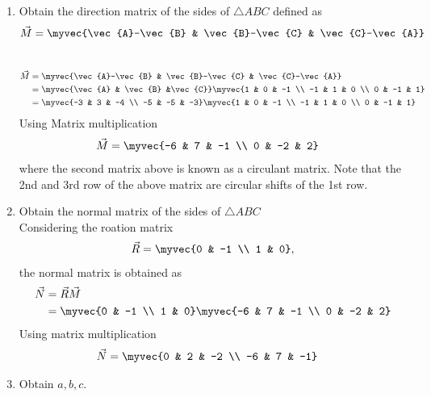 \documentclass[11pt]{book}
\begin{document}
\begin{enumerate}[label=\thesubsection.\arabic*.,ref=\thesubsection.\theenumi]
\item Obtain the direction matrix of the sides of $\triangle ABC$ defined as 
\begin{align}
\vec{M} = 	\myvec{\vec{A}-\vec{B} & \vec{B}-\vec{C} & \vec{C}-\vec{A}}
\end{align}
\\
\solution 
\begin{align}
\vec{M} &= \myvec{\vec{A}-\vec{B} & \vec{B}-\vec{C} & \vec{C}-\vec{A}} \\
	&= \myvec{\vec{A} & \vec{B} &\vec{C}} \myvec{1 & 0 & -1 \\ -1 & 1 & 0 \\ 0 & -1 & 1} \\
 &=\myvec{-3 & 3 & -4 \\ -5 & -5 & -3}\myvec{1 & 0 & -1 \\ -1 & 1 & 0 \\ 0 & -1 & 1} 
 \end{align}
 Using Matrix multiplication
 \begin{align}
 \vec{M} &=\myvec{-6 & 7 & -1 \\ 0 & -2 & 2}
\end{align}
where the second matrix above is known as a circulant matrix.  Note that the 2nd and 3rd row of the above matrix are circular shifts of the 1st row.
\item Obtain the normal matrix  of the sides of $\triangle ABC$ \\
\solution Considering the roation matrix
\begin{align}
\vec{R}  = \myvec{0 & -1 \\ 1 & 0},
\end{align}
the normal matrix is obtained as
\begin{align}
\vec{N} &= \vec{R}\vec{M}  \\
&=\myvec{0 & -1 \\ 1 & 0}\myvec{-6 & 7 & -1 \\ 0 & -2 & 2} 
\end{align}
Using matrix multiplication 
\begin{align}
   \vec{N} &= \myvec{0 & 2 & -2 \\ -6 & 7 & -1}
\end{align}
\item Obtain $a, b, c$. \\

\end{enumerate}
\end{document}
